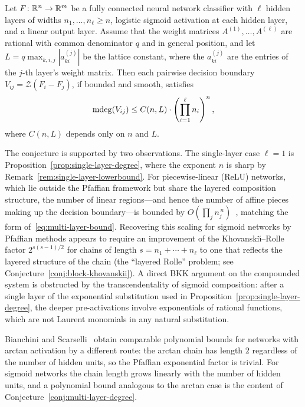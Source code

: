 \begin{conjecture}\label{conj:multi-layer-degree}
  Let $F\colon \mathbb{R}^n \to \mathbb{R}^m$ be a fully connected neural network classifier with $\ell$ hidden layers of widths $n_1,\ldots,n_\ell \geq n$, logistic sigmoid activation at each hidden layer, and a linear output layer. Assume that the weight matrices $A^{(1)},\ldots,A^{(\ell)}$ are rational with common denominator $q$ and in general position, and let $L=q\max_{k,i,j}|a_{ki}^{(j)}|$ be the lattice constant, where the $a_{ki}^{(j)}$ are the entries of the $j$-th layer's weight matrix. Then each pairwise decision boundary $V_{ij} = \mathcal{Z}(F_i-F_j)$, if bounded and smooth, satisfies
  \begin{equation}\label{eq:multi-layer-bound}
    \operatorname{\mathrm{mdeg}}(V_{ij}) \leq C(n,L)\cdot \left(\prod_{i=1}^\ell n_i\right)^n,
  \end{equation}
  where $C(n,L)$ depends only on $n$ and $L$.
\end{conjecture}

The conjecture is supported by two observations. The single-layer case $\ell = 1$ is Proposition~\ref{prop:single-layer-degree}, where the exponent $n$ is sharp by Remark~\ref{rem:single-layer-lowerbound}. For piecewise-linear (ReLU) networks, which lie outside the Pfaffian framework but share the layered composition structure, the number of linear regions---and hence the number of affine pieces making up the decision boundary---is bounded by $O(\prod_j n_j^{\,n})$~\cite{montufar2014,hanin2019}, matching the form of~\eqref{eq:multi-layer-bound}. Recovering this scaling for sigmoid networks by Pfaffian methods appears to require an improvement of the Khovanski\u\i--Rolle factor $2^{s(s-1)/2}$ for chains of length $s = n_1+\cdots+n_\ell$ to one that reflects the layered structure of the chain (the ``layered Rolle'' problem; see Conjecture~\ref{conj:block-khovanskii}). A direct BKK argument on the compounded system is obstructed by the transcendentality of sigmoid composition: after a single layer of the exponential substitution used in Proposition~\ref{prop:single-layer-degree}, the deeper pre-activations involve exponentials of rational functions, which are not Laurent monomials in any natural substitution.

\begin{remark}
Bianchini and Scarselli~\cite{bianchini2014complexity} obtain comparable polynomial bounds for networks with arctan activation by a different route: the arctan chain has length $2$ regardless of the number of hidden units, so the Pfaffian exponential factor is trivial. For sigmoid networks the chain length grows linearly with the number of hidden units, and a polynomial bound analogous to the arctan case is the content of Conjecture~\ref{conj:multi-layer-degree}.
\end{remark}

